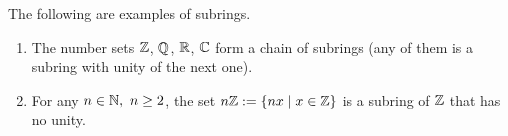 \begin{example}
  The following are examples of subrings.
  \begin{enumerate}
    \item
      The number sets $\mathbb{Z}$, $\mathbb{Q}$, $\mathbb{R}$, $\mathbb{C}$ form a chain of subrings
      (any of them is a subring with unity of the next one).
    \item
      For any $n \in \mathbb{N},\ n \geq 2$, the set $n \mathbb{Z} := \left\{ n x \mid x \in \mathbb{Z} \right\}$ is a
      subring of $\mathbb{Z}$ that has no unity.
  \end{enumerate}
\end{example}
